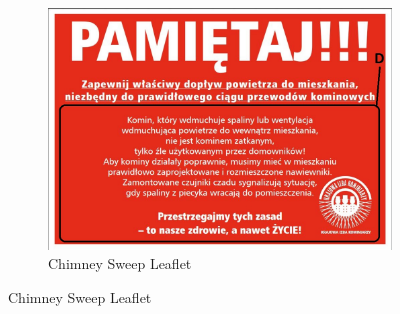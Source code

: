 \documentclass[a4paper,11pt,oneside]{scrreprt}
\begin{document}
\begin{figure}[H]
	

\begin{subfigure}{1\textwidth}
	\centering
	\includegraphics[clip, trim=0cm 0cm 0cm 0cm, scale=0.4]{./images/kominiarze-ulotka.jpg}
	\caption{Chimney Sweep Leaflet}
\end{subfigure}
\label{fig:test}

\end{figure}
\end{document}
